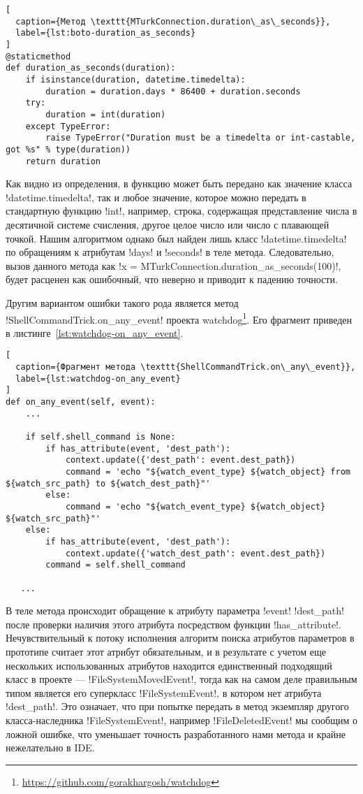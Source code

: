 \begin{lstlisting}[
  caption={Метод \texttt{MTurkConnection.duration\_as\_seconds}},
  label={lst:boto-duration_as_seconds}
]
@staticmethod
def duration_as_seconds(duration):
    if isinstance(duration, datetime.timedelta):
        duration = duration.days * 86400 + duration.seconds
    try:
        duration = int(duration)
    except TypeError:
        raise TypeError("Duration must be a timedelta or int-castable, got %s" % type(duration))
    return duration
\end{lstlisting}

Как видно из определения, в функцию может быть передано как значение класса
!datetime.timedelta!, так и любое значение, которое можно передать в стандартную
функцию !int!, например, строка, содержащая представление числа в десятичной
системе счисления, другое целое число или число с плавающей точкой. Нашим
алгоритмом однако был найден лишь класс !datetime.timedelta! по обращениям к
атрибутам !days! и !seconds! в теле метода. Следовательно, вызов данного метода
как !x = MTurkConnection.duration_as_seconds(100)!, будет расценен как
ошибочный, что неверно и приводит к падению точности.

\newpage

Другим вариантом ошибки такого рода является метод !ShellCommandTrick.on_any_event!
проекта watchdog\footnote{\url{https://github.com/gorakhargosh/watchdog}}. Его
фрагмент приведен в листинге~\ref{lst:watchdog-on_any_event}.

\begin{lstlisting}[
  caption={Фрагмент метода \texttt{ShellCommandTrick.on\_any\_event}},
  label={lst:watchdog-on_any_event}
]
def on_any_event(self, event):
    ...

    if self.shell_command is None:
        if has_attribute(event, 'dest_path'):
            context.update({'dest_path': event.dest_path})
            command = 'echo "${watch_event_type} ${watch_object} from ${watch_src_path} to ${watch_dest_path}"'
        else:
            command = 'echo "${watch_event_type} ${watch_object} ${watch_src_path}"'
    else:
        if has_attribute(event, 'dest_path'):
            context.update({'watch_dest_path': event.dest_path})
        command = self.shell_command

   ... 
\end{lstlisting}

В теле метода происходит обращение к атрибуту параметра !event! !dest_path!
после проверки наличия этого атрибута посредством функции !has_attribute!.
Нечувствительный к потоку исполнения алгоритм поиска атрибутов параметров в
прототипе считает этот атрибут обязательным, и в результате с учетом еще
нескольких использованных атрибутов находится единственный подходящий класс в
проекте --- !FileSystemMovedEvent!, тогда как на самом деле правильным типом
является его суперкласс !FileSystemEvent!, в котором нет атрибута !dest_path!.
Это означает, что при попытке передать в метод экземпляр другого
класса-наследника !FileSystemEvent!, например !FileDeletedEvent! мы сообщим о
ложной ошибке, что уменьшает точность разработанного нами метода и крайне
нежелательно в IDE.

